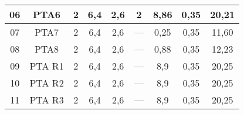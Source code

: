 \begin{table}[h!]
\begin{tabular}{|c|c|c|c|c|c|c|c|c|}
	06                 & PTA6               & 2                                                    & 6,4                                         & 2,6                                           & 2                                             & 8,86                                             & 0,35                                            & 20,21                                                             \\ \hline
	07                 & PTA7               & 2                                                    & 6,4                                         & 2,6                                           & ---                                           & 0,25                                             & 0,35                                            & 11,60                                                             \\ \hline
	08                 & PTA8               & 2                                                    & 6,4                                         & 2,6                                           & ---                                           & 0,88                                             & 0,35                                            & 12,23                                                             \\ \hline
	09                 & PTA R1             & 2                                                    & 6,4                                         & 2,6                                           & ---                                           & 8,9                                              & 0,35                                            & 20,25                                                             \\ \hline
	10                 & PTA R2             & 2                                                    & 6,4                                         & 2,6                                           & ---                                           & 8,9                                              & 0,35                                            & 20,25                                                             \\ \hline
	11                 & PTA R3             & 2                                                    & 6,4                                         & 2,6                                           & ---                                           & 8,9                                              & 0,35                                            & 20,25                                                             \\ \hline

\end{tabular}
\end{table}
